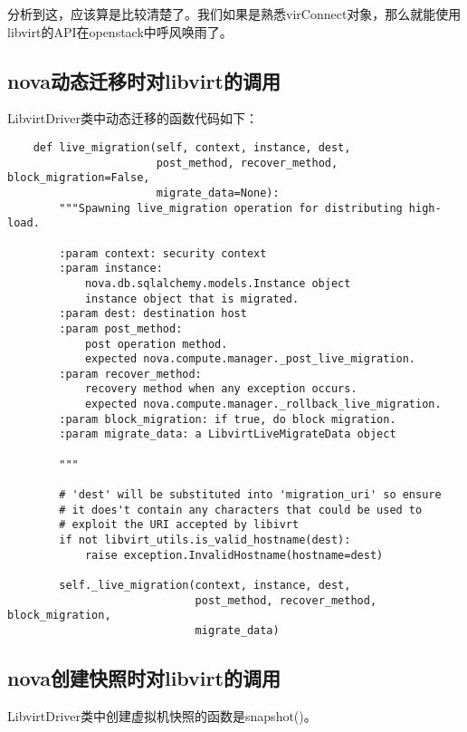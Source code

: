\documentclass[a4paper,left=1.5cm,right=1.5cm,11pt]{article}
\begin{document}
	分析到这，应该算是比较清楚了。我们如果是熟悉virConnect对象，那么就能使用libvirt的API在openstack中呼风唤雨了。\par

\clearpage

\subsection{nova动态迁移时对libvirt的调用}
	LibvirtDriver类中动态迁移的函数代码如下：
	\begin{lstlisting}
	def live_migration(self, context, instance, dest,
                       post_method, recover_method, block_migration=False,
                       migrate_data=None):
        """Spawning live_migration operation for distributing high-load.

        :param context: security context
        :param instance:
            nova.db.sqlalchemy.models.Instance object
            instance object that is migrated.
        :param dest: destination host
        :param post_method:
            post operation method.
            expected nova.compute.manager._post_live_migration.
        :param recover_method:
            recovery method when any exception occurs.
            expected nova.compute.manager._rollback_live_migration.
        :param block_migration: if true, do block migration.
        :param migrate_data: a LibvirtLiveMigrateData object

        """

        # 'dest' will be substituted into 'migration_uri' so ensure
        # it does't contain any characters that could be used to
        # exploit the URI accepted by libivrt
        if not libvirt_utils.is_valid_hostname(dest):
            raise exception.InvalidHostname(hostname=dest)

        self._live_migration(context, instance, dest,
                             post_method, recover_method, block_migration,
                             migrate_data)
	\end{lstlisting}

\clearpage

\subsection{nova创建快照时对libvirt的调用}
	LibvirtDriver类中创建虚拟机快照的函数是snapshot()。\par
\end{document}
